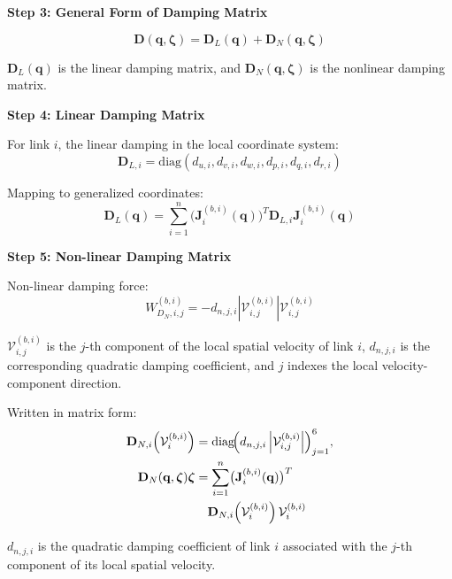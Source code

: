 \documentclass[12pt,a4paper]{report}
\newcommand{\newsymbols}[1]{\par\noindent{}#1\par\vspace{0.35em}}
\begin{document}
\textbf{Step 3: General Form of Damping Matrix}

\begin{equation}
\mathbf{D}(\mathbf{q},\boldsymbol{\zeta}) = \mathbf{D}_L(\mathbf{q}) + \mathbf{D}_N(\mathbf{q},\boldsymbol{\zeta})
\label{eq:old-131}
\end{equation}
\newsymbols{$\mathbf{D}_L(\mathbf{q})$ is the linear damping matrix, and $\mathbf{D}_N(\mathbf{q},\boldsymbol{\zeta})$ is the nonlinear damping matrix.}

\textbf{Step 4: Linear Damping Matrix}

For link $i$, the linear damping in the local coordinate system:
\begin{equation}
\mathbf{D}_{L,i} = \text{diag}(d_{u,i}, d_{v,i}, d_{w,i}, d_{p,i}, d_{q,i}, d_{r,i})
\label{eq:old-132}
\end{equation}

Mapping to generalized coordinates:
\begin{equation}
\mathbf{D}_L(\mathbf{q}) = \sum_{i=1}^{n} \bigl(\mathbf{J}_i^{(b,i)}(\mathbf{q})\bigr)^T \mathbf{D}_{L,i} \mathbf{J}_i^{(b,i)}(\mathbf{q})
\label{eq:old-133}
\end{equation}

\textbf{Step 5: Non-linear Damping Matrix}

Non-linear damping force:
\begin{equation}
W_{D_N,i,j}^{(b,i)} = -d_{n,j,i} \left|\mathcal{V}_{i,j}^{(b,i)}\right| \mathcal{V}_{i,j}^{(b,i)}
\label{eq:old-134}
\end{equation}
\newsymbols{$\mathcal{V}_{i,j}^{(b,i)}$ is the $j$-th component of the local spatial velocity of link $i$, $d_{n,j,i}$ is the corresponding quadratic damping coefficient, and $j$ indexes the local velocity-component direction.}

Written in matrix form:
\begin{equation}
\begin{aligned}
\mathbf{D}_{N,i}\!\left(\mathcal{V}_i^{(b,i)}\right)
&=
\operatorname{diag}\!\Bigl(d_{n,j,i}\left|\mathcal{V}_{i,j}^{(b,i)}\right|\Bigr)_{j=1}^{6}, \\
\mathbf{D}_N(\mathbf{q},\boldsymbol{\zeta})\boldsymbol{\zeta}
&=
\sum_{i=1}^{n} \bigl(\mathbf{J}_i^{(b,i)}(\mathbf{q})\bigr)^T \\
&\quad
\mathbf{D}_{N,i}\!\left(\mathcal{V}_i^{(b,i)}\right)
\mathcal{V}_i^{(b,i)}
\end{aligned}
\label{eq:old-135}
\end{equation}
\newsymbols{$d_{n,j,i}$ is the quadratic damping coefficient of link $i$ associated with the $j$-th component of its local spatial velocity.}
\end{document}
